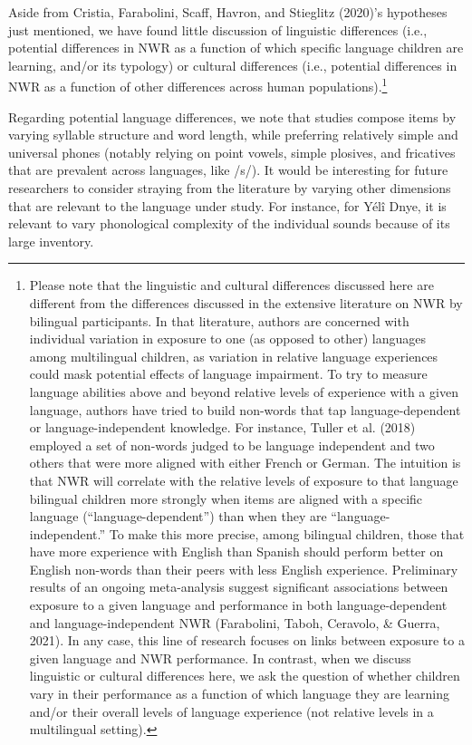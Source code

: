 \documentclass[
  american,
  ,man,floatsintext]{apa6}
\begin{document}
Aside from Cristia, Farabolini, Scaff, Havron, and Stieglitz (2020)'s hypotheses just mentioned, we have found little discussion of linguistic differences (i.e., potential differences in NWR as a function of which specific language children are learning, and/or its typology) or cultural differences (i.e., potential differences in NWR as a function of other differences across human populations).\footnote{Please note that the linguistic and cultural differences discussed here are different from the differences discussed in the extensive literature on NWR by bilingual participants. In that literature, authors are concerned with individual variation in exposure to one (as opposed to other) languages among multilingual children, as variation in relative language experiences could mask potential effects of language impairment. To try to measure language abilities above and beyond relative levels of experience with a given language, authors have tried to build non-words that tap language-dependent or language-independent knowledge. For instance, Tuller et al. (2018) employed a set of non-words judged to be language independent and two others that were more aligned with either French or German. The intuition is that NWR will correlate with the relative levels of exposure to that language bilingual children more strongly when items are aligned with a specific language (``language-dependent'') than when they are ``language-independent.'' To make this more precise, among bilingual children, those that have more experience with English than Spanish should perform better on English non-words than their peers with less English experience. Preliminary results of an ongoing meta-analysis suggest significant associations between exposure to a given language and performance in both language-dependent and language-independent NWR (Farabolini, Taboh, Ceravolo, \& Guerra, 2021). In any case, this line of research focuses on links between exposure to a given language and NWR performance. In contrast, when we discuss linguistic or cultural differences here, we ask the question of whether children vary in their performance as a function of which language they are learning and/or their overall levels of language experience (not relative levels in a multilingual setting).}

Regarding potential language differences, we note that studies compose items by varying syllable structure and word length, while preferring relatively simple and universal phones (notably relying on point vowels, simple plosives, and fricatives that are prevalent across languages, like /s/). It would be interesting for future researchers to consider straying from the literature by varying other dimensions that are relevant to the language under study. For instance, for Yélî Dnye, it is relevant to vary phonological complexity of the individual sounds because of its large inventory.
\end{document}
